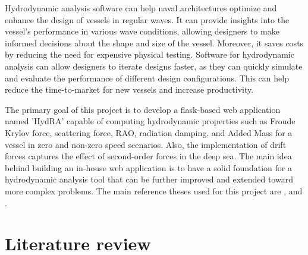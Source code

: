 Hydrodynamic analysis software can help naval architectures optimize and enhance the design of 
vessels in regular waves. It can provide insights into the vessel's performance in various 
wave conditions, 
allowing designers to make informed decisions about the shape and size of the vessel. 
Moreover, it saves costs by reducing the need for expensive physical testing.
Software for hydrodynamic analysis can allow designers to iterate designs faster, 
as they can quickly simulate and evaluate the performance of different design configurations. 
This can help reduce the time-to-market for new vessels and increase productivity.

The primary goal of this project is to develop a flask-based web application named 'HydRA' 
capable of computing hydrodynamic properties such as Froude Krylov force, scattering force, 
RAO, radiation damping, and Added Mass for a vessel in zero and non-zero speed scenarios.
Also, the implementation of drift forces captures the effect of second-order forces in 
the deep sea. The main idea behind building an in-house web application is to have a 
solid foundation for a hydrodynamic analysis tool that can be further improved and 
extended toward more complex problems. The main reference theses used for this project 
are \citet{guha2015estimation}, and \cite{guha2012development}.

\newpage
\section{Literature review}

